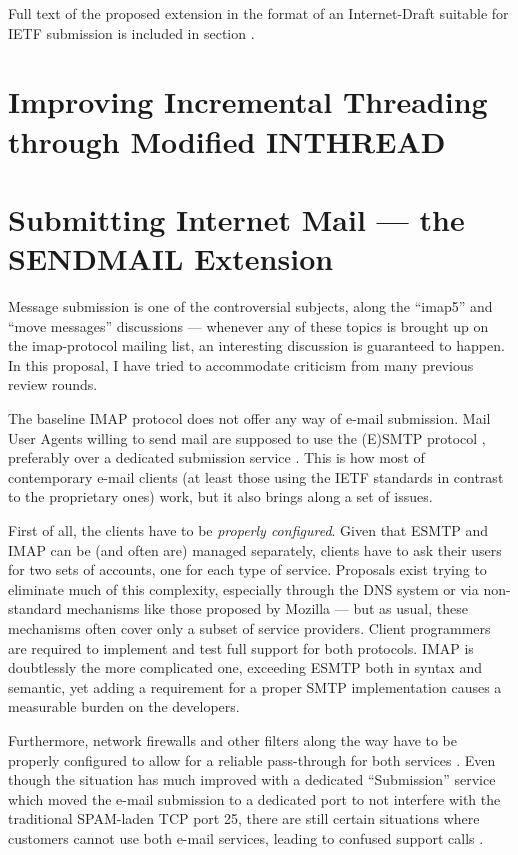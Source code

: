 \documentclass[trojita]{subfiles}
\begin{document}
Full text of the proposed extension in the format of an Internet-Draft suitable for IETF submission is included in
section .

\section{Improving Incremental Threading through Modified INTHREAD}
\label{sec:draft-inthread-ext}

\section{Submitting Internet Mail --- the SENDMAIL Extension}
\label{sec:draft-sendmail}

Message submission is one of the controversial subjects, along the ``imap5'' and ``move messages'' discussions ---
whenever any of these topics is brought up on the imap-protocol mailing list, an interesting discussion is guaranteed to
happen.  In this proposal, I have tried to accommodate criticism from many previous review rounds.

The baseline IMAP protocol does not offer any way of e-mail submission.  Mail User Agents willing to send mail are
supposed to use the (E)SMTP protocol \cite{rfc5321} \cite{rfc2821}, preferably over a dedicated submission service
\cite{rfc6409}.  This is how most of contemporary e-mail clients (at least those using the IETF standards in contrast
to the proprietary ones) work, but it also brings along a set of issues.

First of all, the clients have to be {\em properly configured}.  Given that ESMTP and IMAP can be (and often are)
managed separately, clients have to ask their users for two sets of accounts, one for each type of service.  Proposals
exist trying to eliminate much of this complexity, especially through the DNS system \cite{rfc6186} or via non-standard
mechanisms like those proposed by Mozilla \cite{mozilla-ispdb} --- but as usual, these mechanisms often cover only a
subset of service providers.  Client programmers are required to implement and test full support for both protocols.
IMAP is doubtlessly the more complicated one, exceeding ESMTP both in syntax and semantic, yet adding a requirement for
a proper SMTP implementation causes a measurable burden on the developers.

Furthermore, network firewalls and other filters along the way have to be properly configured to allow for a reliable
pass-through for both services \cite{crocker-beep-multi-conns}.  Even though the situation has much improved with a
dedicated ``Submission'' service \cite{rfc6409} which moved the e-mail submission to a dedicated port to not interfere
with the traditional SPAM-laden TCP port 25, there are still certain situations where customers cannot use both e-mail
services, leading to confused support calls \cite{submission-users-suck-smtp-imap} \cite{panozzo-submission-users-suck}.
\end{document}
